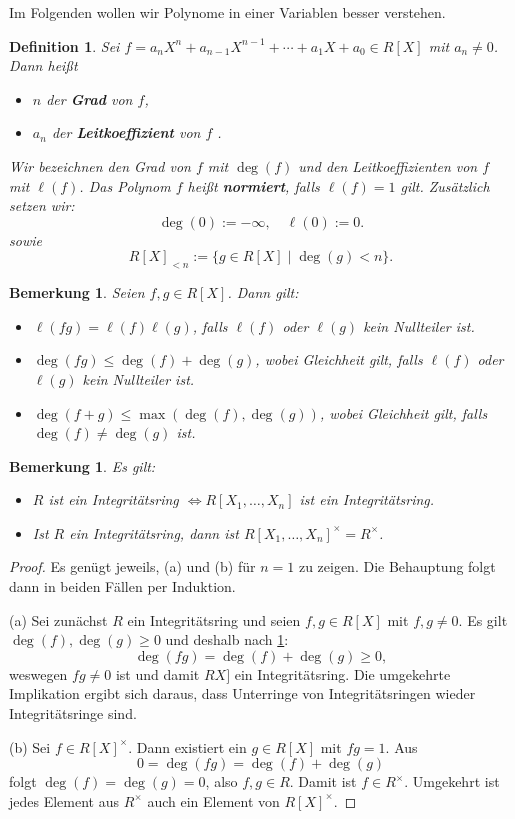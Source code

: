 \documentclass[a4paper, twoside, 11pt, ngerman]{report}
\theoremstyle{definistyle}
\newtheorem{defini}[satz]{Definition}
\newtheorem{bem}[satz]{Bemerkung}
\theoremstyle{remark}
\newcommand{\defn}[1]{\textit{\bfseries #1}}
\begin{document}
Im Folgenden wollen wir Polynome in einer Variablen besser verstehen.

\begin{defini}\label{def:grad_und_leitkoeffizient}
Sei $f = a_n X^n + a_{n-1} X^{n-1} + \cdots + a_1 X + a_0 \in R[X]$ mit $a_n \neq 0$. Dann heißt
\begin{itemize}
    \item $n$ der \defn{Grad} von $f$,
    \item $a_n$ der \defn{Leitkoeffizient} von $f$ .
\end{itemize}
Wir bezeichnen den Grad von $f$ mit $\deg(f)$ und den Leitkoeffizienten von $f$ mit $\ell(f)$.
Das Polynom $f$ heißt \defn{normiert}, falls $\ell(f) = 1$ gilt.
Zusätzlich setzen wir:
\[
\deg(0) := -\infty, \quad \ell(0) := 0.
\]
sowie
\[
R[X]_{< n} := \{ g \in R[X] \mid \deg(g) < n \}.
\]
\end{defini}

\begin{bem}\label{bem:eigenschaften_grad_und_leitkoeffizient}
Seien $f, g \in R[X]$. Dann gilt:
\begin{itemize}
    \item[(a)] $\ell(fg) = \ell(f) \ell(g)$, falls $\ell(f)$ oder $\ell(g)$ kein Nullteiler ist.
    \item[(b)] $\deg(fg) \leq \deg(f) + \deg(g)$, wobei Gleichheit gilt, falls $\ell(f)$ oder $\ell(g)$ kein Nullteiler ist.
    \item[(c)] $\deg(f+g) \leq \max(\deg(f), \deg(g))$, wobei Gleichheit gilt, falls $\deg(f) \neq \deg(g)$ ist.
\end{itemize}
\end{bem}

\begin{bem}\label{bem:eigenschaften_polynomring}
Es gilt:
\begin{itemize}
    \item[(a)] $R$ ist ein Integritätsring $\iff R[X_1, \dots, X_n]$ ist ein Integritätsring.
    \item[(b)] Ist $R$ ein Integritätsring, dann ist $R[X_1, \dots, X_n]^\times = R^\times$.
\end{itemize}
\end{bem}

\begin{proof}
Es genügt jeweils, (a) und (b) für $n = 1$ zu zeigen. Die Behauptung folgt dann in beiden Fällen per Induktion.

(a) Sei zunächst $R$ ein Integritätsring und seien $f, g \in R[X]$ mit $f, g \neq 0$. Es gilt $\deg(f), \deg(g) \geq 0$ und  deshalb nach \ref{bem:eigenschaften_grad_und_leitkoeffizient}:
    \[
    \deg(f g) = \deg(f) + \deg(g) \geq  0,
    \]
weswegen $fg\neq 0$ ist und damit $RX]$ ein Integritätsring. Die umgekehrte Implikation ergibt sich daraus, dass Unterringe von Integritätsringen wieder Integritätsringe sind.

(b) Sei $f \in R[X]^\times$. Dann existiert ein $g \in R[X]$ mit $f g = 1$. Aus 
\[0=\deg(f g)  = \deg(f) + \deg(g)\] folgt $\deg(f) = \deg(g) = 0$, also $f, g \in R$. Damit ist $f \in R^\times$. Umgekehrt ist jedes Element aus $R^\times$ auch ein Element von $R[X]^\times$.
\end{proof}
\end{document}
